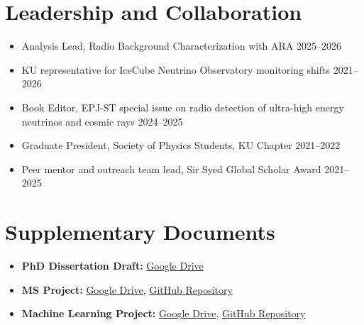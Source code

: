 \documentclass[10pt,letterpaper]{article}
\begin{document}
\section*{Leadership and Collaboration}

\begin{itemize}
    \item Analysis Lead, Radio Background Characterization with ARA \hfill 2025--2026
    \item KU representative for IceCube Neutrino Observatory monitoring shifts \hfill 2021--2026
    \item Book Editor, EPJ-ST special issue on radio detection of ultra-high energy neutrinos and cosmic rays \hfill 2024--2025
    \item Graduate President, Society of Physics Students, KU Chapter \hfill 2021--2022
    \item Peer mentor and outreach team lead, Sir Syed Global Scholar Award \hfill 2021--2025
\end{itemize}

\section*{Supplementary Documents}
\begin{itemize}
    \item {\bf PhD Dissertation Draft:} \href{https://drive.google.com/file/d/1UinAq1_QPhyicPmoP562Z46e-ZZy6qXk/view?usp=share_link}{Google Drive}
    \item {\bf MS Project:} \href{https://drive.google.com/file/d/1Vxa1qtpn6p3xxFlJj_6PylMjX3EVx9bg/view?usp=share_link}{Google Drive}, \href{https://github.com/Mohammad-Neutrino/AAFIYA.git}{GitHub Repository}
    \item {\bf Machine Learning Project:} \href{https://drive.google.com/file/d/19XtX8lAJLDx0Ne5y5iumGRRqAPhCx56o/view?usp=share_link}{Google Drive}, \href{https://github.com/Mohammad-Neutrino/Machine_Learning_Project.git}{GitHub Repository}
\end{itemize}
    
\end{document}
